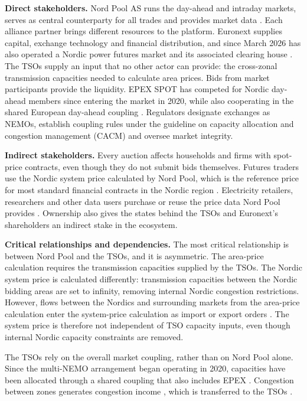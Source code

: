 \textbf{Direct stakeholders.} Nord Pool AS runs the day-ahead and intraday markets, serves as central counterparty for all trades and provides market data \citep{NPAbout,NPClearing}. Each alliance partner brings different resources to the platform. Euronext supplies capital, exchange technology and financial distribution, and since March 2026 has also operated a Nordic power futures market and its associated clearing house \citep{Euronext2026}. The TSOs supply an input that no other actor can provide: the cross-zonal transmission capacities needed to calculate area prices. Bids from market participants provide the liquidity. EPEX SPOT has competed for Nordic day-ahead members since entering the market in 2020, while also cooperating in the shared European day-ahead coupling \citep{EPEX2020}. Regulators designate exchanges as NEMOs, establish coupling rules under the guideline on capacity allocation and congestion management (CACM) \citep{CACM2015} and oversee market integrity.

\textbf{Indirect stakeholders.} Every auction affects households and firms with spot-price contracts, even though they do not submit bids themselves. Futures traders use the Nordic system price calculated by Nord Pool, which is the reference price for most standard financial contracts in the Nordic region \citep{NPPrice}. Electricity retailers, researchers and other data users purchase or reuse the price data Nord Pool provides \citep{NPData,ERR2022}. Ownership also gives the states behind the TSOs and Euronext's shareholders an indirect stake in the ecosystem.

\textbf{Critical relationships and dependencies.} The most critical relationship is between Nord Pool and the TSOs, and it is asymmetric. The area-price calculation requires the transmission capacities supplied by the TSOs. The Nordic system price is calculated differently: transmission capacities between the Nordic bidding areas are set to infinity, removing internal Nordic congestion restrictions. However, flows between the Nordics and surrounding markets from the area-price calculation enter the system-price calculation as import or export orders \citep{NPPrice}. The system price is therefore not independent of TSO capacity inputs, even though internal Nordic capacity constraints are removed.



The TSOs rely on the overall market coupling, rather than on Nord Pool alone. Since the multi-NEMO arrangement began operating in 2020, capacities have been allocated through a shared coupling that also includes EPEX \citep{EPEX2020}. Congestion between zones generates congestion income \citep{EU2019943}, which is transferred to the TSOs \citep[Article~68]{CACM2015}.

